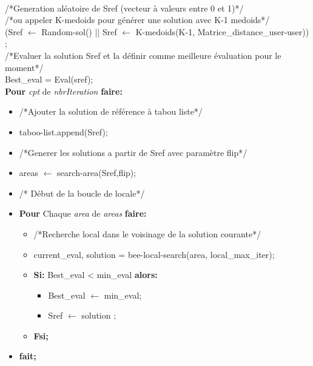 \begin{algorithm}[H]
\hspace*{\algorithmicindent}	\\/*Generation aléatoire de Sref (vecteur à valeurs entre 0 et 1)*/
 \hspace*{\algorithmicindent}	\\/*ou appeler K-medoids pour générer une solution avec K-1 medoids*/  
	\hspace*{\algorithmicindent} \\(Sref $\leftarrow$ Random-sol() || Sref $\leftarrow$ K-medoids(K-1, Matrice{\_}distance{\_}user-user)) ;
	\hspace*{\algorithmicindent}\\ /*Evaluer la solution Sref et la définir comme meilleure évaluation pour le moment*/  
		\hspace*{\algorithmicindent}\\  Best{\_}eval = Eval(sref);
	\hspace*{\algorithmicindent}\\  \textbf{Pour} \textit{cpt} de \textit{nbrIteration} \textbf{faire:}
			\begin{itemize}
				\item [] /*Ajouter la solution de référence à tabou liste*/
				\item [] taboo-list.append(Sref);	
				\item [] /*Generer les solutions a partir de Sref avec paramètre flip*/
				\item [] areas $\leftarrow$ search-area(Sref,flip);
				\item [] /* Début de la boucle de locale*/
				\item  [] \textbf{Pour} Chaque \textit{area} de \textit{areas} \textbf{faire:}
				\begin{itemize}
					\item [] /*Recherche local dans le voisinage de la solution courante*/
					\item []   current{\_}eval, solution = bee-local-search(area, local{\_}max{\_}iter);
					\item [] \textbf{Si:}  Best{\_}eval < min{\_}eval \textbf{alors:}
					\begin{itemize}
						\item []  Best{\_}eval $\leftarrow$ min{\_}eval;
						\item [] Sref $\leftarrow$  solution ;
					\end{itemize}
					
					\item []  \textbf{Fsi;}		
				\end{itemize}
				\item []  \textbf{fait;}	
			\end{itemize}
		
\end{algorithm}	
